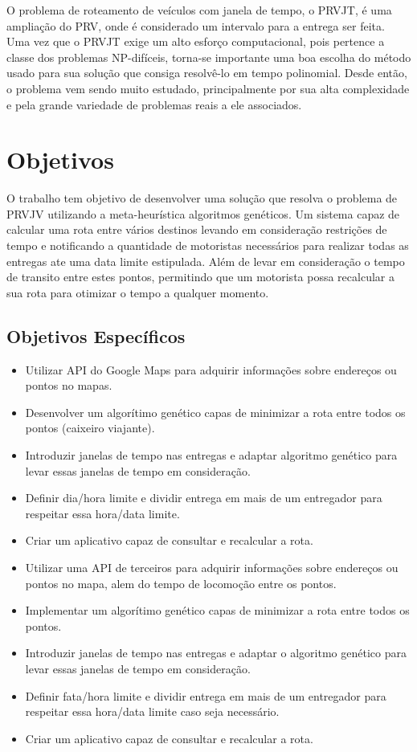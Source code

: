 O problema de roteamento de veículos com janela de tempo, o PRVJT, é uma ampliação do PRV, onde é considerado um intervalo para a entrega ser feita.
Uma vez que o PRVJT exige um alto esforço computacional, pois pertence a classe dos problemas NP-difíceis, torna-se importante uma boa escolha do método usado para sua solução que consiga resolvê-lo em tempo polinomial.
Desde então, o problema vem sendo muito estudado, principalmente por sua alta complexidade e pela grande variedade de problemas reais a ele associados.

\section{Objetivos}

O trabalho tem objetivo de desenvolver uma solução que resolva o problema de PRVJV utilizando a meta-heurística algoritmos genéticos. Um sistema capaz de calcular uma rota entre vários destinos 
levando em consideração restrições de tempo e notificando a quantidade de motoristas necessários para realizar todas as entregas ate uma data limite estipulada. Além de levar  
em consideração o tempo de transito entre estes pontos, permitindo que um motorista possa recalcular a sua rota para otimizar o tempo a qualquer momento.

\subsection{Objetivos Específicos}

\begin{itemize}
	\item Utilizar API do Google Maps para adquirir informações sobre endereços ou pontos no mapas.
	\item Desenvolver um algorítimo genético capas de minimizar a rota entre todos os pontos (caixeiro viajante).
	\item Introduzir janelas de tempo nas entregas e adaptar algoritmo genético para levar essas janelas de tempo em consideração.
	\item Definir dia/hora limite e dividir entrega em mais de um entregador para respeitar essa hora/data limite.
	\item Criar um aplicativo capaz de consultar e recalcular a rota.
	\item Utilizar uma API de terceiros para adquirir informações sobre endereços ou pontos no mapa, alem do tempo de locomoção entre os pontos.
	\item Implementar um algorítimo genético capas de minimizar a rota entre todos os pontos.
	\item Introduzir janelas de tempo nas entregas e adaptar o algoritmo genético para levar essas janelas de tempo em consideração.
	\item Definir fata/hora limite e dividir entrega em mais de um entregador para respeitar essa hora/data limite caso seja necessário.
	\item Criar um aplicativo capaz de consultar e recalcular a rota.
\end{itemize}


